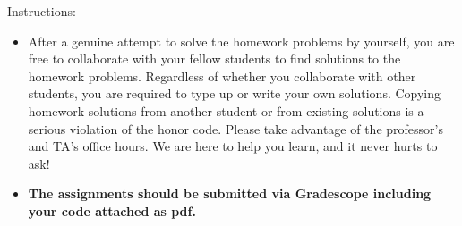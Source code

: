 
\newtoggle{solution}
\toggletrue{solution} %

\usepackage[colorlinks = true,
            linkcolor = blue,
            urlcolor  = blue,
            citecolor = blue,
            anchorcolor = blue]{hyperref}

\newcommand{\myhref}[3][blue]{\href{#2}{\color{#1}{#3}}}%
\usepackage{hyperref}






Instructions:
\begin{itemize}
\item After a genuine attempt to solve the homework problems by yourself, you are free to collaborate with your fellow students to find solutions to the homework problems. Regardless of whether you collaborate with other students, you are required to type up or write your own solutions. Copying homework solutions from another student or from existing solutions is a serious violation of the honor code. Please take advantage of  the professor's and TA's office hours. We are here to help you learn, and it never hurts to ask!
\item {\bf  The assignments should be submitted via Gradescope including your code attached as pdf.}

\end{itemize}



